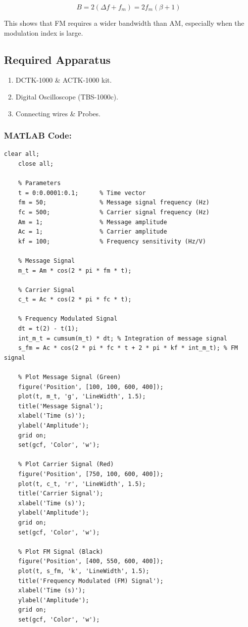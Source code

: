 \documentclass[a4paper,12pt]{article}
\begin{document}
	\begin{equation}
		B = 2(\Delta f + f_m) = 2f_m(\beta + 1)
	\end{equation}
	
	This shows that FM requires a wider bandwidth than AM, especially when the modulation index is large.
	
	
	\subsection{Required Apparatus}
	\begin{enumerate}
		
		\item DCTK-1000 \& ACTK-1000 kit.
		\item	Digital Oscilloscope (TBS-1000c).
		\item Connecting wires \& Probes.
	\end{enumerate}
	
	\newpage
	\subsubsection{MATLAB Code:}
	\begin{lstlisting}[style=vscode-light, caption={Frequency Modulation.} ]
	clear all;
	close all;
	
	% Parameters
	t = 0:0.0001:0.1;      % Time vector
	fm = 50;               % Message signal frequency (Hz)
	fc = 500;              % Carrier signal frequency (Hz)
	Am = 1;                % Message amplitude
	Ac = 1;                % Carrier amplitude
	kf = 100;              % Frequency sensitivity (Hz/V)
	
	% Message Signal
	m_t = Am * cos(2 * pi * fm * t);      
	
	% Carrier Signal
	c_t = Ac * cos(2 * pi * fc * t);      
	
	% Frequency Modulated Signal
	dt = t(2) - t(1); 
	int_m_t = cumsum(m_t) * dt; % Integration of message signal
	s_fm = Ac * cos(2 * pi * fc * t + 2 * pi * kf * int_m_t); % FM signal
	
	% Plot Message Signal (Green)
	figure('Position', [100, 100, 600, 400]);
	plot(t, m_t, 'g', 'LineWidth', 1.5);
	title('Message Signal');
	xlabel('Time (s)');
	ylabel('Amplitude');
	grid on;
	set(gcf, 'Color', 'w');
	
	% Plot Carrier Signal (Red)
	figure('Position', [750, 100, 600, 400]);
	plot(t, c_t, 'r', 'LineWidth', 1.5);
	title('Carrier Signal');
	xlabel('Time (s)');
	ylabel('Amplitude');
	grid on;
	set(gcf, 'Color', 'w');
	
	% Plot FM Signal (Black)
	figure('Position', [400, 550, 600, 400]);
	plot(t, s_fm, 'k', 'LineWidth', 1.5);
	title('Frequency Modulated (FM) Signal');
	xlabel('Time (s)');
	ylabel('Amplitude');
	grid on;
	set(gcf, 'Color', 'w');
	
	
	
		
		
	\end{lstlisting}
\end{document}

